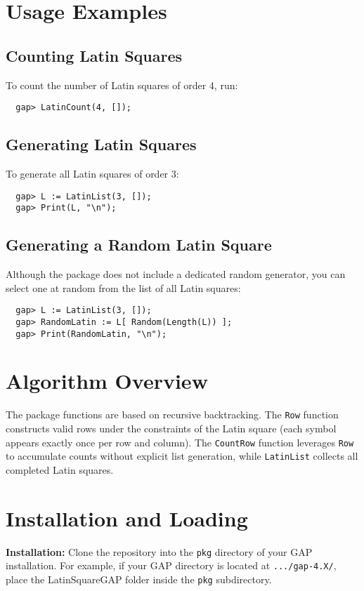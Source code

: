 \documentclass{report}
\begin{document}
\chapter{Usage Examples}
\section{Counting Latin Squares}
To count the number of Latin squares of order 4, run:
\begin{verbatim}
  gap> LatinCount(4, []);
\end{verbatim}

\section{Generating Latin Squares}
To generate all Latin squares of order 3:
\begin{verbatim}
  gap> L := LatinList(3, []);
  gap> Print(L, "\n");
\end{verbatim}

\section{Generating a Random Latin Square}
Although the package does not include a dedicated random generator, you can select one at random from the list of all Latin squares:
\begin{verbatim}
  gap> L := LatinList(3, []);
  gap> RandomLatin := L[ Random(Length(L)) ];
  gap> Print(RandomLatin, "\n");
\end{verbatim}

\chapter{Algorithm Overview}
The package functions are based on recursive backtracking. The \texttt{Row} function constructs valid rows under the constraints of the Latin square (each symbol appears exactly once per row and column). The \texttt{CountRow} function leverages \texttt{Row} to accumulate counts without explicit list generation, while \texttt{LatinList} collects all completed Latin squares.

\chapter{Installation and Loading}
\textbf{Installation:}  
Clone the repository into the \texttt{pkg} directory of your GAP installation. For example, if your GAP directory is located at \texttt{.../gap-4.X/}, place the LatinSquareGAP folder inside the \texttt{pkg} subdirectory.
\end{document}
